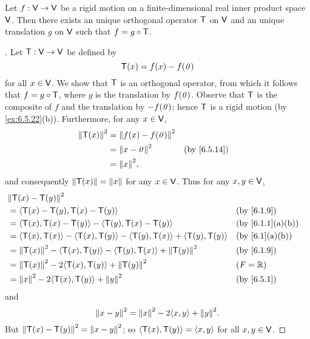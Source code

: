 \begin{thm}\label{6.22}
  Let \(f : \mathsf{V} \to \mathsf{V}\) be a rigid motion on a finite-dimensional real inner product space \(\mathsf{V}\).
  Then there exists an unique orthogonal operator \(\mathsf{T}\) on \(\mathsf{V}\) and an unique translation \(g\) on \(\mathsf{V}\) such that \(f = g \circ \mathsf{T}\).
\end{thm}

\begin{proof}[]
  Let \(\mathsf{T} : \mathsf{V} \to \mathsf{V}\) be defined by
  \[
    \mathsf{T}(x) = f(x) - f(\mathit{0})
  \]
  for all \(x \in \mathsf{V}\).
  We show that \(\mathsf{T}\) is an orthogonal operator, from which it follows that \(f = g \circ \mathsf{T}\), where \(g\) is the translation by \(f(\mathit{0})\).
  Observe that \(\mathsf{T}\) is the composite of \(f\) and the translation by \(-f(\mathit{0})\);
  hence \(\mathsf{T}\) is a rigid motion (by \cref{ex:6.5.22}(b)).
  Furthermore, for any \(x \in \mathsf{V}\),
  \begin{align*}
    \norm{\T(x)}^2 & = \norm{f(x) - f(\zv)}^2                  \\
                   & = \norm{x - \zv}^2       &  & \by{6.5.14} \\
                   & = \norm{x}^2,
  \end{align*}
  and consequently \(\left\lVert\mathsf{T}(x)\right\rVert = \left\lVert x\right\rVert\) for any \(x \in \mathsf{V}\).
  Thus for any \(x, y \in \mathsf{V}\),
  \begin{align*}
     & \norm{\T(x) - \T(y)}^2                                                                                   \\
     & = \inn{\T(x) - \T(y), \T(x) - \T(y)}                                                &  & \by{6.1.9}      \\
     & = \inn{\T(x), \T(x) - \T(y)} - \inn{\T(y), \T(x) - \T(y)}                           &  & \by{6.1.1}[a,b] \\
     & = \inn{\T(x), \T(x)} - \inn{\T(x), \T(y)} - \inn{\T(y), \T(x)} + \inn{\T(y), \T(y)} &  & \by{6.1}[a,b]   \\
     & = \norm{\T(x)}^2 - \inn{\T(x), \T(y)} - \inn{\T(y), \T(x)} + \norm{\T(y)}^2         &  & \by{6.1.9}      \\
     & = \norm{\T(x)}^2 - 2 \inn{\T(x), \T(y)} + \norm{\T(y)}^2                            &  & (\F = \R)       \\
     & = \norm{x}^2 - 2 \inn{\T(x), \T(y)} + \norm{y}^2                                    &  & \by{6.5.1}
  \end{align*}
  and
  \[
    \norm{x - y}^2 = \norm{x}^2 - 2 \inn{x, y} + \norm{y}^2.
  \]
  But \(\left\lVert\mathsf{T}(x) - \mathsf{T}(y)\right\rVert^2 = \left\lVert x - y\right\rVert^2\);
  so \(\left\langle\mathsf{T}(x), \mathsf{T}(y)\right\rangle = \left\langle x, y\right\rangle\) for all \(x, y \in \mathsf{V}\).


\end{proof}

